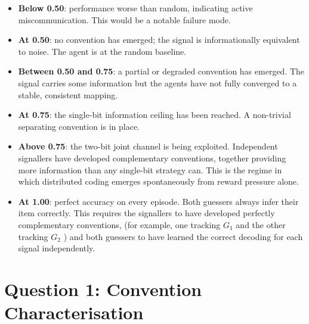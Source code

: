 \documentclass[a4paper,twoside,12pt]{report}
\begin{document}
     
    \begin{itemize}
        \item \textbf{Below 0.50}: performance worse than random, indicating
        active miscommunication. This would be a notable failure mode.
     
        \item \textbf{At 0.50}: no convention has emerged; the signal is
        informationally equivalent to noise. The agent is at the random
        baseline.
     
        \item \textbf{Between 0.50 and 0.75}: a partial or degraded convention
        has emerged. The signal carries some information but the agents have not
        fully converged to a stable, consistent mapping.
     
        \item \textbf{At 0.75}: the single-bit information ceiling has been
        reached. A non-trivial separating convention is in place.
     
        \item \textbf{Above 0.75}: the two-bit joint channel is being exploited.
        Independent signallers have developed complementary conventions, together
        providing more information than any single-bit strategy can. This is the
        regime in which distributed coding emerges spontaneously from reward
        pressure alone.
     
        \item \textbf{At 1.00}: perfect accuracy on every episode. Both guessers
        always infer their item correctly. This requires the signallers to have
        developed perfectly complementary conventions, (for example, one
        tracking $G_1$ and the other tracking $G_2$ ) and both guessers to
        have learned the correct decoding for each signal independently.
    \end{itemize}
    
    
    
    \section{Question 1: Convention Characterisation}
    \label{sec:q1}
    
\end{document}
